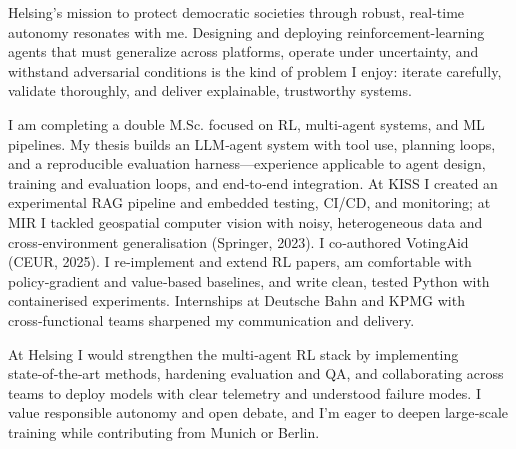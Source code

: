 Helsing’s mission to protect democratic societies through robust, real-time autonomy resonates with me. Designing and deploying reinforcement-learning agents that must generalize across platforms, operate under uncertainty, and withstand adversarial conditions is the kind of problem I enjoy: iterate carefully, validate thoroughly, and deliver explainable, trustworthy systems.

I am completing a double M.Sc. focused on RL, multi‑agent systems, and ML pipelines. My thesis builds an LLM‑agent system with tool use, planning loops, and a reproducible evaluation harness—experience applicable to agent design, training and evaluation loops, and end‑to‑end integration. At KISS I created an experimental RAG pipeline and embedded testing, CI/CD, and monitoring; at MIR I tackled geospatial computer vision with noisy, heterogeneous data and cross‑environment generalisation (Springer, 2023). I co‑authored VotingAid (CEUR, 2025). I re‑implement and extend RL papers, am comfortable with policy‑gradient and value‑based baselines, and write clean, tested Python with containerised experiments. Internships at Deutsche Bahn and KPMG with cross‑functional teams sharpened my communication and delivery.

At Helsing I would strengthen the multi‑agent RL stack by implementing state‑of‑the‑art methods, hardening evaluation and QA, and collaborating across teams to deploy models with clear telemetry and understood failure modes. I value responsible autonomy and open debate, and I’m eager to deepen large‑scale training while contributing from Munich or Berlin.